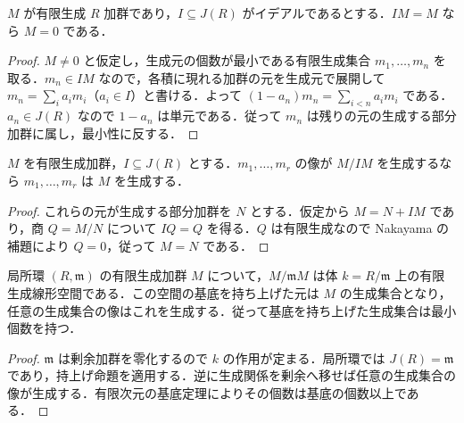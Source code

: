 \begin{prop}[Nakayamaの補題]
$M$ が有限生成 $R$ 加群であり，$I\subseteq J(R)$ がイデアルであるとする．$IM=M$ なら $M=0$ である．
\end{prop}
\begin{proof}
$M\ne0$ と仮定し，生成元の個数が最小である有限生成集合 $m_1,\ldots,m_n$ を取る．$m_n\in IM$ なので，各積に現れる加群の元を生成元で展開して $m_n=\sum_i a_i m_i$（$a_i\in I$）と書ける．よって $(1-a_n)m_n=\sum_{i<n}a_i m_i$ である．$a_n\in J(R)$ なので $1-a_n$ は単元である．従って $m_n$ は残りの元の生成する部分加群に属し，最小性に反する．
\end{proof}
\begin{prop}[剰余加群からの生成元の持上げ]
$M$ を有限生成加群，$I\subseteq J(R)$ とする．$m_1,\ldots,m_r$ の像が $M/IM$ を生成するなら $m_1,\ldots,m_r$ は $M$ を生成する．
\end{prop}
\begin{proof}
これらの元が生成する部分加群を $N$ とする．仮定から $M=N+IM$ であり，商 $Q=M/N$ について $IQ=Q$ を得る．$Q$ は有限生成なので Nakayama の補題により $Q=0$，従って $M=N$ である．
\end{proof}
\begin{prop}[局所環上の極小生成数]
局所環 $(R,\mathfrak m)$ の有限生成加群 $M$ について，$M/\mathfrak m M$ は体 $k=R/\mathfrak m$ 上の有限生成線形空間である．この空間の基底を持ち上げた元は $M$ の生成集合となり，任意の生成集合の像はこれを生成する．従って基底を持ち上げた生成集合は最小個数を持つ．
\end{prop}
\begin{proof}
$\mathfrak m$ は剰余加群を零化するので $k$ の作用が定まる．局所環では $J(R)=\mathfrak m$ であり，持上げ命題を適用する．逆に生成関係を剰余へ移せば任意の生成集合の像が生成する．有限次元の基底定理によりその個数は基底の個数以上である．
\end{proof}

